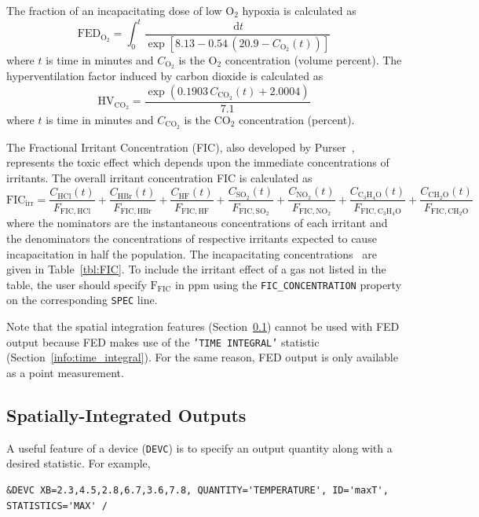 \documentclass[11pt]{book}
\newcommand{\ct}{\tt\small}
\renewcommand{\d}{\,\mathrm{d}}
\newcommand{\be}{\begin{equation}}
\newcommand{\ee}{\end{equation}}
\begin{document}
The fraction of an incapacitating dose of low O${}_2$ hypoxia is calculated as
\be
\mathrm{FED}_\mathrm{O_2} =  \int_0^t \frac{\d t}{\exp \left [ 8.13 - 0.54 \, (20.9 - C_\mathrm{O_2}(t)) \right ] }
\ee
where $t$ is time in minutes and $C_\mathrm{O_2}$ is the O${}_2$ concentration (volume percent).
The hyperventilation factor induced by carbon dioxide is calculated as
\be
\mathrm{HV}_\mathrm{CO_2} = \frac{ \exp( 0.1903 \, C_\mathrm{CO_2}(t) +  2.0004 ) }{7.1} \label{co2hyp}
\ee
where $t$ is time in minutes and $C_\mathrm{CO_2}$ is the CO${}_2$ concentration (percent).

The Fractional Irritant Concentration (FIC), also developed by Purser~\cite{SFPE:Purser}, represents the toxic effect which
depends upon the immediate concentrations of irritants. The overall irritant concentration FIC is calculated as
\be
\mathrm{FIC}_\mathrm{irr} =
    \frac{C_\mathrm{HCl}(t)}    {F_\mathrm{FIC,HCl}} +
    \frac{C_\mathrm{HBr}(t)}    {F_\mathrm{FIC,HBr}} +
    \frac{C_\mathrm{HF}(t)}     {F_\mathrm{FIC,HF}} +
    \frac{C_\mathrm{SO_2}(t)}   {F_\mathrm{FIC,SO_2}} +
    \frac{C_\mathrm{NO_2}(t)}   {F_\mathrm{FIC,NO_2}} +
    \frac{C_\mathrm{C_3H_4O}(t)}{F_\mathrm{FIC,C_3H_4O}} +
    \frac{C_\mathrm{CH_2O}(t)}  {F_\mathrm{FIC,CH_2O}}
\ee
where the nominators are the instantaneous concentrations of each irritant and the denominators the concentrations of respective irritants
expected to cause incapacitation in half the population. The incapacitating concentrations~\cite{SFPE:Purser} are given in Table~\ref{tbl:FIC}.
To include the irritant effect of a gas not listed in the table, the user should specify $\mathrm{F_{FIC}}$ in ppm using the {\ct FIC\_CONCENTRATION}
property on the corresponding {\ct SPEC} line.

Note that the spatial integration features (Section~\ref{info:statistics}) cannot be used with FED output because FED makes
use of the {\ct 'TIME INTEGRAL'} statistic (Section~\ref{info:time_integral}). For the same reason, FED output is only available as a point
measurement.

\subsection{Spatially-Integrated Outputs}
\label{info:statistics}

A useful feature of a device ({\ct DEVC}) is to specify an output quantity along with a desired statistic. For example,

\footnotesize
\begin{verbatim}
&DEVC XB=2.3,4.5,2.8,6.7,3.6,7.8, QUANTITY='TEMPERATURE', ID='maxT', STATISTICS='MAX' /
\end{verbatim}
\normalsize
\end{document}
